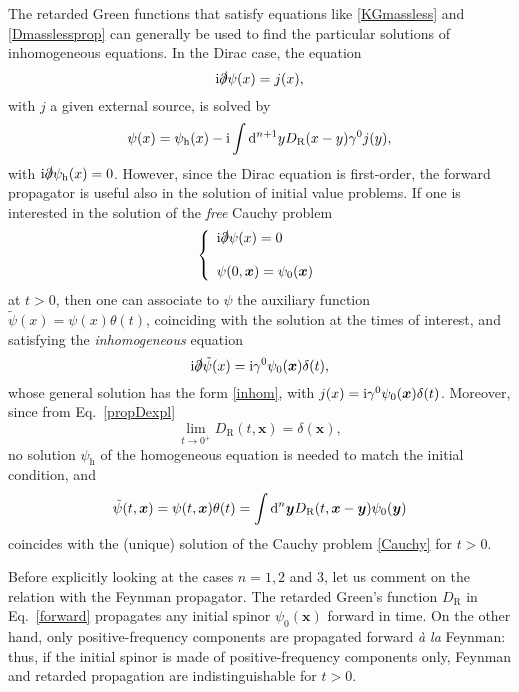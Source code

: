The retarded Green functions that satisfy equations like \eqref{KGmassless} and \eqref{Dmasslessprop} can generally be used to find the particular solutions of inhomogeneous equations. In the Dirac case, the equation
\begin{equation}
\mathrm{i} \slashed{\partial} \psi(x) = j(x),
\end{equation}
with $j$ a given external source, is solved by
\begin{equation}\label{inhom}
\psi(x) = \psi_{\textrm{h}}(x) - \mathrm{i} \int \mathrm{d}^{n+1}y D_{\textrm{R}}(x-y) \gamma^0 j(y) ,
\end{equation}
with $\mathrm{i}\slashed{\partial}\psi_{\textrm{h}}(x)=0$. However, since the Dirac equation is first-order, the forward propagator is useful also in the solution of initial value problems. If one is interested in the solution of the \emph{free} Cauchy problem
\begin{equation}\label{Cauchy}
\left \{ \begin{array}{l} \mathrm{i} \slashed{\partial} \psi(x) = 0 \\ \\ \psi(0,\bm{x})=\psi_0(\bm{x}) \end{array} \right. 
\end{equation}
at $t>0$, then one can associate to $\psi$ the auxiliary function $\tilde{\psi}(x)=\psi(x)\theta(t)$, coinciding with the solution at the times of interest, and satisfying the \emph{inhomogeneous} equation
\begin{equation}
\mathrm{i} \slashed{\partial} \tilde{\psi}(x) = \mathrm{i} \gamma^0 \psi_0(\bm{x}) \delta(t) ,
\end{equation}
whose general solution has the form \eqref{inhom}, with $j(x)=\mathrm{i}\gamma^0\psi_0(\bm{x}) \delta(t)$. Moreover, since from Eq.\ \eqref{propDexpl}
\begin{equation}
\lim_{t\to 0^+} D_{\textrm{R}} (t, \bm{x}) = \delta(\bm{x}),
\end{equation}
no solution $\psi_{\textrm{h}}$ of the homogeneous equation is needed to match the initial condition, and
\begin{equation}
\label{forward}
\tilde{\psi}(t,\bm{x}) = \psi(t,\bm{x}) \theta(t) = \int \mathrm{d}^n\bm{y} D_{\textrm{R}}(t,\bm{x}-\bm{y}) \psi_0(\bm{y}) 
\end{equation}
coincides with the (unique) solution of the Cauchy problem \eqref{Cauchy} for $t>0$. 

Before explicitly looking at the cases $n=1,2$ and $3$, let us comment on the relation with the Feynman propagator. The retarded Green's function $D_{\textrm{R}}$ in Eq.~\eqref{forward} propagates any initial spinor $\psi_0(\bm{x})$ forward in time. On the other hand, only positive-frequency components are propagated forward \emph{\`a la} Feynman: thus, if the initial spinor is made of positive-frequency components only, Feynman and retarded propagation are indistinguishable for $t>0$.


